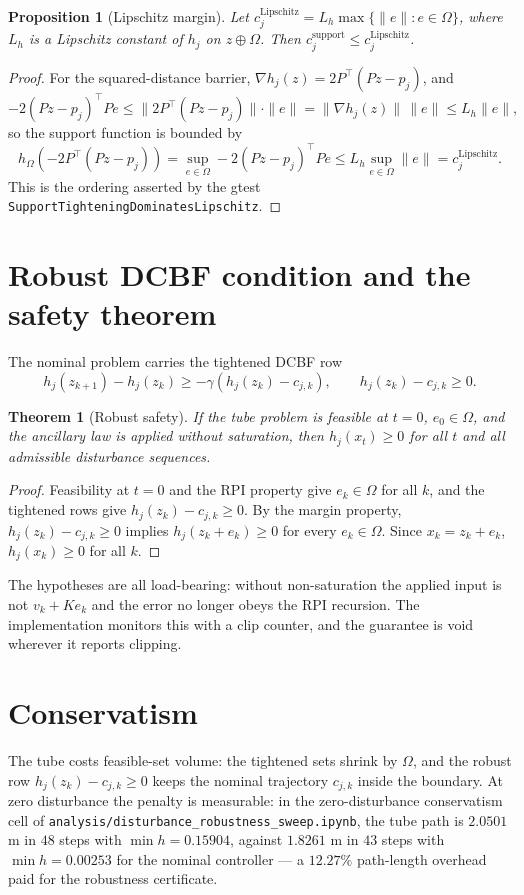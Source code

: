 \documentclass[11pt]{article}
\newtheorem{theorem}{Theorem}
\newtheorem{proposition}{Proposition}
\newcommand{\Msum}{\oplus}
\begin{document}
\begin{proposition}[Lipschitz margin]
Let $c^{\mathrm{Lipschitz}}_j = L_h \max\{\|e\| : e \in \Omega\}$, where $L_h$ is a Lipschitz
constant of $h_j$ on $z \Msum \Omega$. Then
$c^{\mathrm{support}}_j \le c^{\mathrm{Lipschitz}}_j$.
\end{proposition}
\begin{proof}
For the squared-distance barrier, $\nabla h_j(z) = 2P^\top(Pz - p_j)$, and
\[
-2(Pz-p_j)^\top P e \le \|2P^\top(Pz-p_j)\| \cdot \|e\|
= \|\nabla h_j(z)\|\, \|e\| \le L_h \|e\|,
\]
so the support function is bounded by
\[
h_\Omega\!\left(-2P^\top(Pz-p_j)\right) = \sup_{e\in\Omega} -2(Pz-p_j)^\top P e
\le L_h \sup_{e\in\Omega} \|e\| = c^{\mathrm{Lipschitz}}_j .
\]
This is the ordering asserted by the gtest \texttt{SupportTighteningDominatesLipschitz}.
\end{proof}

\section{Robust DCBF condition and the safety theorem}
The nominal problem carries the tightened DCBF row
\[
h_j(z_{k+1}) - h_j(z_k) \ge -\gamma\left(h_j(z_k) - c_{j,k}\right), \qquad h_j(z_k) - c_{j,k} \ge 0 .
\]
\begin{theorem}[Robust safety]
If the tube problem is feasible at $t=0$, $e_0 \in \Omega$, and the ancillary law is applied without
saturation, then $h_j(x_t) \ge 0$ for all $t$ and all admissible disturbance sequences.
\end{theorem}
\begin{proof}
Feasibility at $t=0$ and the RPI property give $e_k \in \Omega$ for all $k$, and the tightened
rows give $h_j(z_k) - c_{j,k} \ge 0$. By the margin property, $h_j(z_k) - c_{j,k} \ge 0$ implies
$h_j(z_k + e_k) \ge 0$ for every $e_k \in \Omega$. Since $x_k = z_k + e_k$, $h_j(x_k) \ge 0$ for
all $k$.
\end{proof}
The hypotheses are all load-bearing: without non-saturation the applied input is not $v_k + K e_k$
and the error no longer obeys the RPI recursion. The implementation monitors this with a clip
counter, and the guarantee is void wherever it reports clipping.

\section{Conservatism}
The tube costs feasible-set volume: the tightened sets shrink by $\Omega$, and the robust row
$h_j(z_k) - c_{j,k} \ge 0$ keeps the nominal trajectory $c_{j,k}$ inside the boundary. At zero
disturbance the penalty is measurable: in the zero-disturbance conservatism cell of
\texttt{analysis/disturbance\_robustness\_sweep.ipynb}, the tube path is $2.0501$ m in $48$ steps
with $\min h = 0.15904$, against $1.8261$ m in $43$ steps with $\min h = 0.00253$ for the nominal
controller --- a $12.27\%$ path-length overhead paid for the robustness certificate.
\end{document}

